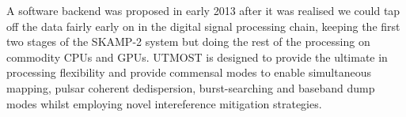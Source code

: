 A software backend was proposed in early 2013 after it was realised we could tap off the data fairly early on in the digital signal processing chain, keeping the first two stages of the SKAMP-2 system but doing the rest of the processing on commodity CPUs and GPUs. UTMOST is designed to provide the ultimate in processing flexibility and provide commensal modes to enable simultaneous mapping, pulsar coherent dedispersion, burst-searching and baseband dump modes whilst employing novel intereference mitigation strategies.